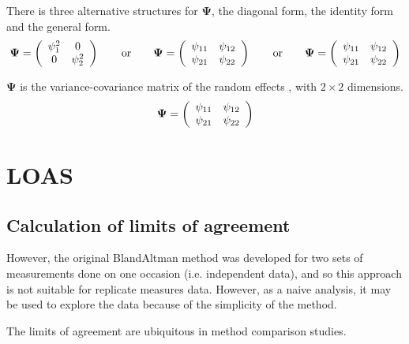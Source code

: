\documentclass[12pt, a4paper]{report}
\theoremstyle{plain}
\theoremstyle{definition}
\theoremstyle{remark}
\begin{document}
	
	There is three alternative structures for
	$\boldsymbol{\Psi}$, the diagonal form, the identity form and the general form.
	\[
	\boldsymbol{\Psi} =
	\left(%
	\begin{array}{c c}
	\psi^2_1 & 0  \\
	0 & \psi^2_2  \\
	\end{array}%
	\right)\qquad \mathrm{or} \qquad \boldsymbol{\Psi} =
	\left(%
	\begin{array}{c c}
	\psi_{11} & \psi_{12}  \\
	\psi_{21} & \psi_{22}  \\
	\end{array}%
	\right)
	\qquad \mathrm{or} \qquad \boldsymbol{\Psi} =
	\left(%
	\begin{array}{c c}
	\psi_{11} & \psi_{12}  \\
	\psi_{21} & \psi_{22}  \\
	\end{array}%
	\right)
	\]
	
	$\boldsymbol{\Psi}$ is the variance-covariance matrix of the random effects ,
	with $2 \times 2$ dimensions.
	\begin{equation}
	\boldsymbol{\Psi} =
	\left(%
	\begin{array}{c c}
	\psi_{11} & \psi_{12}  \\
	\psi_{21} & \psi_{22}  \\
	\end{array}%
	\right)
	\end{equation}






\chapter{LOAS}
\section{Calculation of limits of agreement }

However, the original BlandAltman method was developed for two sets of measurements done on one occasion (i.e. independent data), and so this approach is not suitable for replicate measures data. However, as a naive analysis, it may be used to explore the data because of the simplicity of the method.
  
The limits of agreement \citep{BA86} are ubiquitous in method comparison studies. \bigskip  
\end{document}
